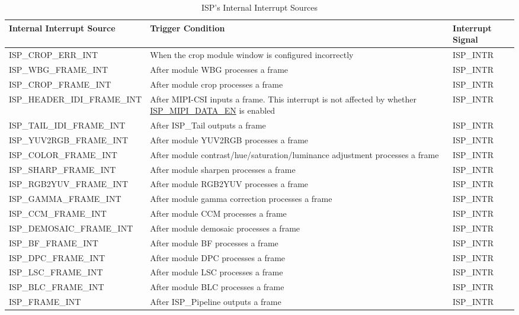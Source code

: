 \documentclass[main\_\_EN.tex]{subfiles}
\begin{document}
\begin{longtable}{ | L{5.5cm} | L{6.5cm} | L{3cm} | }
\caption{ISP's Internal Interrupt Sources} \label{tab:isp-int-sources}
\\ \hline
{}
\textbf{Internal Interrupt Source} & \textbf{Trigger Condition}  &  \textbf{Interrupt Signal}\\ \hline
    ISP\_CROP\_ERR\_INT & When the crop module window is configured incorrectly & ISP\_INTR \\ \hline
    ISP\_WBG\_FRAME\_INT & After module WBG processes a frame & ISP\_INTR \\ \hline
    ISP\_CROP\_FRAME\_INT & After module crop processes a frame & ISP\_INTR \\ \hline
    ISP\_HEADER\_IDI\_FRAME\_INT & After MIPI-CSI inputs a frame. This interrupt is not affected by whether \hyperref[fielddesc:ISPMIPIDATAEN]{ISP\_MIPI\_DATA\_EN} is enabled & ISP\_INTR \\ \hline
    ISP\_TAIL\_IDI\_FRAME\_INT & After ISP\_Tail outputs a frame & ISP\_INTR \\ \hline
    ISP\_YUV2RGB\_FRAME\_INT & After module YUV2RGB processes a frame & ISP\_INTR \\ \hline
    ISP\_COLOR\_FRAME\_INT & After module contrast/hue/saturation/luminance adjustment processes a frame & ISP\_INTR \\ \hline
    ISP\_SHARP\_FRAME\_INT & After module sharpen processes a frame & ISP\_INTR \\ \hline
    ISP\_RGB2YUV\_FRAME\_INT & After module RGB2YUV processes a frame & ISP\_INTR \\ \hline
    ISP\_GAMMA\_FRAME\_INT & After module gamma correction processes a frame & ISP\_INTR \\ \hline
    ISP\_CCM\_FRAME\_INT & After module CCM processes a frame & ISP\_INTR \\ \hline
    ISP\_DEMOSAIC\_FRAME\_INT & After module demosaic processes a frame & ISP\_INTR \\ \hline
    ISP\_BF\_FRAME\_INT & After module BF processes a frame & ISP\_INTR \\ \hline
    ISP\_DPC\_FRAME\_INT & After module DPC processes a frame & ISP\_INTR \\ \hline
    ISP\_LSC\_FRAME\_INT & After module LSC processes a frame & ISP\_INTR \\ \hline
    ISP\_BLC\_FRAME\_INT & After module BLC processes a frame & ISP\_INTR \\ \hline
    ISP\_FRAME\_INT & After ISP\_Pipeline outputs a frame & ISP\_INTR \\ \hline

\end{longtable}
\end{document}
